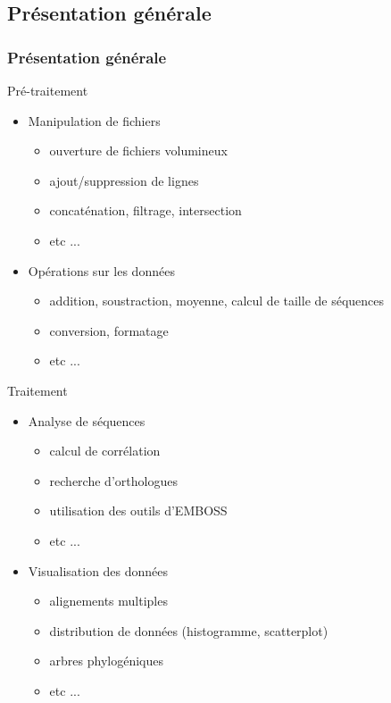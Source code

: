 \documentclass[12pt]{beamer}
\begin{document}
\subsection{Présentation générale}
\begin{frame}
\frametitle{Présentation générale}
\begin{block}{Pré-traitement}
\begin{itemize}
\item Manipulation de fichiers
	\begin{itemize}
	\item ouverture de fichiers volumineux
	\item ajout/suppression de lignes
	\item concaténation, filtrage, intersection
	\item etc ...
	\end{itemize}
	\pause
\item Opérations sur les données
	\begin{itemize}
	\item addition, soustraction, moyenne, calcul de taille de séquences
	\item conversion, formatage
	\item etc ...
	\end{itemize}
\end{itemize}

\end{block}
\end{frame}
\begin{frame}
\begin{block}{Traitement}

\begin{itemize}
\frametitle{Présentation générale}
\item Analyse de séquences
	\begin{itemize}
	\item calcul de corrélation
	\item recherche d'orthologues
	\item utilisation des outils d'EMBOSS
	\item etc ...
	\end{itemize}
	\pause
\item Visualisation des données
	\begin{itemize}
	\item alignements multiples
	\item distribution de données (histogramme, scatterplot)
	\item arbres phylogéniques
	\item etc ...
	\end{itemize}
\end{itemize}

\end{block}
\end{frame}
\end{document}
